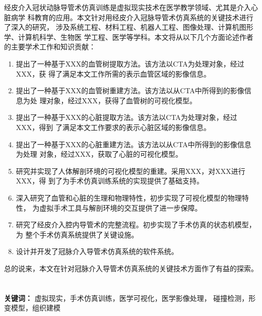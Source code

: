 经皮介入冠状动脉导管术仿真训练是虚拟现实技术在医学教学领域、尤其是介入心脏病学
科教育的应用。本文针对用经皮介入冠脉导管术仿真系统的关键技术进行了深入的研究，
涉及系统工程、材料工程、机器人工程、图像处理、计算机图形学、计算机科学、生物医
学工程、医学等学科。本文将从以下几个方面论述作者的主要学术工作和知识贡献：
\begin{enumerate}
    \item 提出了一种基于XXX的血管树提取方法。该方法以CTA为处理对象，经过XXX，获
    得了满足本文工作所需的表示血管区域的影像信息。
    \item 提出了一种基于XXX的血管树重建方法。该方法以从CTA中所得到的影像信息为处
    理对象，经过XXX，获得了血管树的可视化模型。
    \item 提出了一种基于XXX的心脏提取方法。该方法以CTA为处理对象，经过XXX，得到
    了满足本文工作要求的表示心脏区域的影像信息。
    \item 提出了一种基于XXX的心脏重建方法。该方法以从CTA中所得到的影像信息为处理
    对象，经过XXX，获取了心脏的可视化模型。
    \item 研究并实现了人体解剖环境的可视化模型的重建。采用XXX，对XXX进行XXX，得
    到了为手术仿真训练系统的实现提供了基础支持。
    \item 深入研究了血管和心脏的生理和物理特性，初步实现了可视化模型的物理特性，
    为虚拟手术工具与解剖环境的交互提供了进一步保障。
    \item 研究了经皮介入腔内导管术的完整流程。初步实现了手术仿真的状态机模型，为
    整个手术仿真系统提供了关键设施。
    \item 设计并开发了冠脉介入导管术仿真系统的软件系统。
\end{enumerate}
总的说来，本文在针对冠脉介入导管术仿真系统的关键技术方面作了有益的探索。
\\
\\
\\
\noindent \textbf{关键词：} 虚拟现实，手术仿真训练，医学可视化，医学影像处理，
碰撞检测，形变模型，组织建模
